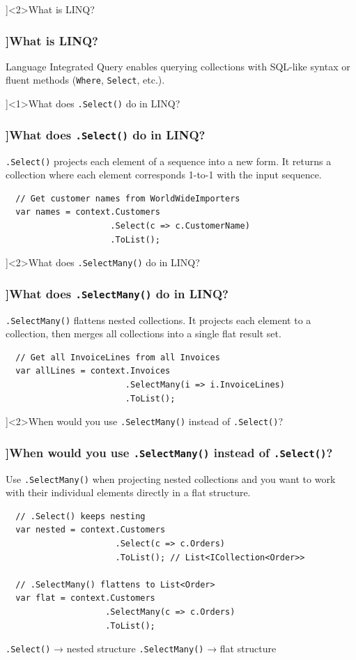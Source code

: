 \QuestionSlide[\CategoryBadge[LinqColor!20]{LINQ}]<2>{What is LINQ?}
\begin{frame}[fragile]
  \frametitle{\AnswerTitle[\CategoryBadge[LinqColor!20]{LINQ}]{What is LINQ?}}
  {\footnotesize
  Language Integrated Query enables querying collections with SQL-like syntax or fluent methods (\texttt{Where}, \texttt{Select}, etc.).
  }
\end{frame}

\QuestionSlide[\CategoryBadge[LinqColor!20]{LINQ}]<1>{What does \texttt{.Select()} do in LINQ?}
\begin{frame}[fragile]
  \frametitle{\AnswerTitle[\CategoryBadge[LinqColor!20]{LINQ}]{What does \texttt{.Select()} do in LINQ?}}
  {\footnotesize
  \texttt{.Select()} projects each element of a sequence into a new form. It returns a collection where each element corresponds 1-to-1 with the input sequence.
  }
  \begin{verbatim}
  // Get customer names from WorldWideImporters
  var names = context.Customers
                     .Select(c => c.CustomerName)
                     .ToList();
  \end{verbatim}
\end{frame}

\QuestionSlide[\CategoryBadge[LinqColor!20]{LINQ}]<2>{What does \texttt{.SelectMany()} do in LINQ?}
\begin{frame}[fragile]
  \frametitle{\AnswerTitle[\CategoryBadge[LinqColor!20]{LINQ}]{What does \texttt{.SelectMany()} do in LINQ?}}
  {\footnotesize
  \texttt{.SelectMany()} flattens nested collections. It projects each element to a collection, then merges all collections into a single flat result set.
  }
  \begin{verbatim}
  // Get all InvoiceLines from all Invoices
  var allLines = context.Invoices
                        .SelectMany(i => i.InvoiceLines)
                        .ToList();
  \end{verbatim}
\end{frame}

\QuestionSlide[\CategoryBadge[LinqColor!20]{LINQ}]<2>{When would you use \texttt{.SelectMany()} instead of \texttt{.Select()}?}
\begin{frame}[fragile]
  \frametitle{\AnswerTitle[\CategoryBadge[LinqColor!20]{LINQ}]{When would you use \texttt{.SelectMany()} instead of \texttt{.Select()}?}}
  {\footnotesize
  Use \texttt{.SelectMany()} when projecting nested collections and you want to work with their individual elements directly in a flat structure.
  }
  \begin{verbatim}
  // .Select() keeps nesting
  var nested = context.Customers
                      .Select(c => c.Orders)
                      .ToList(); // List<ICollection<Order>>

  // .SelectMany() flattens to List<Order>
  var flat = context.Customers
                    .SelectMany(c => c.Orders)
                    .ToList();
  \end{verbatim}
  {\footnotesize
  \texttt{.Select()} → nested structure  
  \texttt{.SelectMany()} → flat structure
  }
\end{frame}
